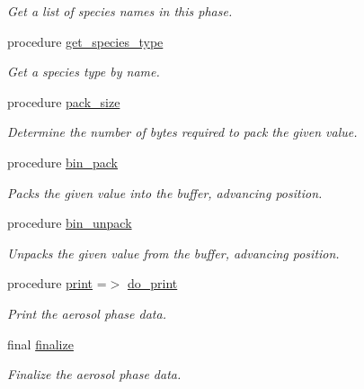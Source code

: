 \begin{DoxyCompactItemize}
\begin{DoxyCompactList}\small\item\em Get a list of species names in this phase. \end{DoxyCompactList}\item 
procedure \mbox{\hyperlink{structpmc__aero__phase__data_1_1aero__phase__data__t_a9a27e08fddd0651f3bf294e55aa47682}{get\+\_\+species\+\_\+type}}
\begin{DoxyCompactList}\small\item\em Get a species type by name. \end{DoxyCompactList}\item 
procedure \mbox{\hyperlink{structpmc__aero__phase__data_1_1aero__phase__data__t_a3fbf468c731830500d01afdb5fa65efe}{pack\+\_\+size}}
\begin{DoxyCompactList}\small\item\em Determine the number of bytes required to pack the given value. \end{DoxyCompactList}\item 
procedure \mbox{\hyperlink{structpmc__aero__phase__data_1_1aero__phase__data__t_a4047c051b0c0eb9dfb53455a76e31648}{bin\+\_\+pack}}
\begin{DoxyCompactList}\small\item\em Packs the given value into the buffer, advancing position. \end{DoxyCompactList}\item 
procedure \mbox{\hyperlink{structpmc__aero__phase__data_1_1aero__phase__data__t_aa4d86d5681ce2f7e8fe52a6baaa7884d}{bin\+\_\+unpack}}
\begin{DoxyCompactList}\small\item\em Unpacks the given value from the buffer, advancing position. \end{DoxyCompactList}\item 
procedure \mbox{\hyperlink{structpmc__aero__phase__data_1_1aero__phase__data__t_a4ee618a333c0f42bddfb8e0ae575ac36}{print}} =$>$ \mbox{\hyperlink{namespacepmc__aero__phase__data_aaf65be8c5ab43c4930479af66b8632b7}{do\+\_\+print}}
\begin{DoxyCompactList}\small\item\em Print the aerosol phase data. \end{DoxyCompactList}\item 
final \mbox{\hyperlink{structpmc__aero__phase__data_1_1aero__phase__data__t_a2f49623fd9a2c815e772ff84b378cf61}{finalize}}
\begin{DoxyCompactList}\small\item\em Finalize the aerosol phase data. \end{DoxyCompactList}\item 

\end{DoxyCompactItemize}
